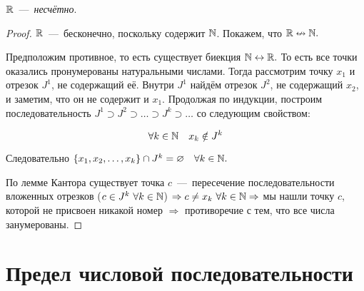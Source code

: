     \begin{theorem}
        $\mathbb{R}$~---~\textit{несчётно}.
    \end{theorem}
    \begin{proof}
        $\mathbb{R}$~---~бесконечно, поскольку содержит $\mathbb{N}$. Покажем, что $\mathbb{R} \nleftrightarrow \mathbb{N}.$

        Предположим противное, то есть существует биекция $\mathbb{N} \leftrightarrow \mathbb{R}.$ То есть все точки оказались пронумерованы натуральными числами. Тогда рассмотрим точку $x_{1}$ и отрезок $J^{1}$, не содержащий её. Внутри $J^{1}$ найдём отрезок $J^{2}$, не содержащий $x_{2}$, и заметим, что он не содержит и $x_{1}$. Продолжая по индукции, построим последовательность $J^{1} \supset J^{2} \supset \ldots \supset J^{k} \supset \dots$ со следующим свойством:

        $$ \forall k \in \mathbb{N} \quad x_{k} \notin J^{k}$$

        Следовательно $\{ x_{1}, x_{2}, \dots, x_{k} \} \cap J^{k} = \varnothing \quad \forall k \in \mathbb{N}.$

        По лемме Кантора существует точка $c$~---~пересечение последовательности вложенных отрезков ($c \in J^{k} \  \forall k \in \mathbb{N}$) $\Rightarrow c \neq x_{k} \   \forall k \in \mathbb{N} \Rightarrow$ мы нашли точку $c$, которой не присвоен никакой номер $\Rightarrow$ противоречие с тем, что все числа занумерованы.
    \end{proof}

    \newpage
    
\section{Предел числовой последовательности}

